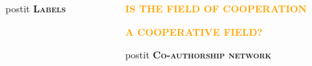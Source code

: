 \documentclass[usenames,dvipsnames,t]{beamer}
\newcommand*\circled[1]{\tikz[baseline=(char.base)]{
            \node[shape=circle,draw,inner sep=2pt] (char) {#1};}}
\begin{document}
\begin{columns}
\begin{column}{.33\linewidth}
\begin{center}
        
        \vspace{-.5cm}

        \begin{minipage}{4cm}
            \begin{beamercolorbox}[ht=.7cm, sep=.1em, wd=2.3cm, rounded=true]{postit}
            \textcolor{solarizedBase03}{\small
             \textbf{\textsc{Labels}}}
            \end{beamercolorbox}
        \end{minipage}
        \vspace{.2cm}

        
    \end{center}

    \vspace{.5cm}
\end{column}
\vrule width 3pt
\begin{column}{.33\linewidth}
    \begin{center}
        \textbf{\Large\textcolor{orange}{\textsc{\circled{3} IS THE FIELD OF COOPERATION}}}
        \vspace{.5cm}
    
        \textbf{\Large\textcolor{orange}{\textsc{A COOPERATIVE FIELD?}}}
    \end{center}
    \vspace{.65cm}

    \begin{center}
        \begin{minipage}{4cm}
            \begin{beamercolorbox}[ht=.7cm, sep=.1em, wd=8cm, rounded=true]{postit}
            \textcolor{solarizedBase03}{\small
             \textbf{\textsc{Co-authorship network}}}
            \end{beamercolorbox}
        \end{minipage}
        \vspace{.5cm}


\end{center}
\end{column}
\end{columns}
\end{document}
